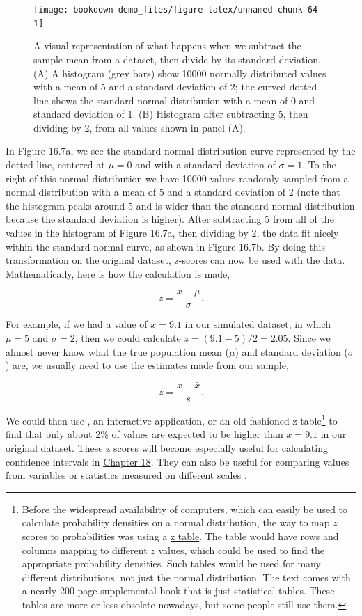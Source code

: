 \documentclass[
  openany]{scrbook}
\begin{document}
\begin{figure}
\texttt{[image: bookdown-demo\_files/figure-latex/unnamed-chunk-64-1]} \caption{A visual representation of what happens when we subtract the sample mean from a dataset, then divide by its standard deviation. (A) A histogram (grey bars) show 10000 normally distributed values with a mean of 5 and a standard deviation of 2; the curved dotted line shows the standard normal distribution with a mean of 0 and standard deviation of 1. (B) Histogram after subtracting 5, then dividing by 2, from all values shown in panel (A).}\label{fig:unnamed-chunk-64}
\end{figure}

In Figure 16.7a, we see the standard normal distribution curve represented by the dotted line, centered at \(\mu = 0\) and with a standard deviation of \(\sigma = 1\).
To the right of this normal distribution we have 10000 values randomly sampled from a normal distribution with a mean of 5 and a standard deviation of 2 (note that the histogram peaks around 5 and is wider than the standard normal distribution because the standard deviation is higher).
After subtracting 5 from all of the values in the histogram of Figure 16.7a, then dividing by 2, the data fit nicely within the standard normal curve, as shown in Figure 16.7b.
By doing this transformation on the original dataset, z-scores can now be used with the data.
Mathematically, here is how the calculation is made,

\[z = \frac{x - \mu}{\sigma}.\]

For example, if we had a value of \(x = 9.1\) in our simulated dataset, in which \(\mu = 5\) and \(\sigma = 2\), then we could calculate \(z = (9.1 - 5) / 2 = 2.05\).
Since we almost never know what the true population mean (\(\mu\)) and standard deviation (\(\sigma\)) are, we usually need to use the estimates made from our sample,

\[z = \frac{x - \bar{x}}{s}.\]

We could then use \citep{Jamovi2022}, an interactive application, or an old-fashioned z-table\footnote{Before the widespread availability of computers, which can easily be used to calculate probability densities on a normal distribution, the way to map \(z\) scores to probabilities was using a \href{https://www.z-table.com/}{z table}. The table would have rows and columns mapping to different \(z\) values, which could be used to find the appropriate probability densities. Such tables would be used for many different distributions, not just the normal distribution. The text \citet{Sokal1995} comes with a nearly 200 page supplemental book that is just statistical tables. These tables are more or less obsolete nowadays, but some people still use them.} to find that only about 2\% of values are expected to be higher than \(x = 9.1\) in our original dataset.
These z scores will become especially useful for calculating confidence intervals in \protect\hyperlink{Chapter_18}{Chapter 18}.
They can also be useful for comparing values from variables or statistics measured on different scales \citep{Sokal1995, Cheadle2003, Adams2016}.
\end{document}
